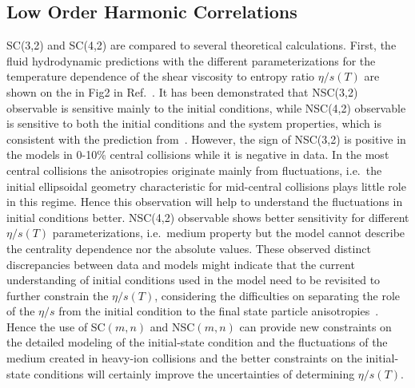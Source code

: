 \documentclass[ALICE,manyauthors]{cernphprep}
\begin{document}
\subsection{Low Order Harmonic Correlations}
SC(3,2) and SC(4,2) are compared to several theoretical calculations. 
First, the fluid hydrodynamic predictions with the different parameterizations for the temperature dependence of the shear viscosity to entropy ratio $\eta/s(T)$ are shown on the in Fig2 in Ref.~\cite{ALICE:2016kpq}. 
It has been demonstrated that NSC(3,2) observable is sensitive mainly to the initial conditions, while NSC(4,2) observable is sensitive to both the initial conditions and the system properties, which is consistent with the prediction from~\cite{Niemi:2012aj}.
However, the sign of NSC(3,2) is positive in the models in 0-10\% central collisions while it is negative in data.
In the most central collisions the anisotropies originate mainly from fluctuations, i.e.\ the initial ellipsoidal geometry characteristic for mid-central collisions plays little role in this regime. Hence this observation will help to understand the fluctuations in initial conditions better.
NSC(4,2) observable shows better sensitivity for different $\eta/s(T)$ parameterizations, i.e.\ medium property but the model cannot describe the centrality dependence nor the absolute values. These observed distinct discrepancies between data and models might indicate that the current understanding of initial conditions used in the model need to be revisited to further constrain the $\eta/s(T)$, considering the difficulties on separating the role of the $\eta/s$  from the initial condition to the final state particle anisotropies~\cite{Romatschke:2007mq,Shen:2011zc}.
Hence the use of SC$(m,n)$ and NSC$(m,n)$ can provide new constraints on the detailed modeling of the initial-state condition and the fluctuations of the medium created in heavy-ion collisions and the better constraints on the initial-state conditions will certainly improve the uncertainties of determining $\eta/s(T)$.
\end{document}
